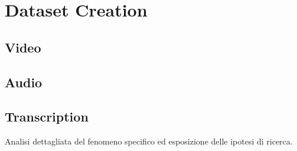 \chapter{Dataset Creation}
\label{ch:dataset}
\section{Video}
\section{Audio}
\section{Transcription}
Analisi dettagliata del fenomeno specifico ed esposizione delle ipotesi di ricerca.